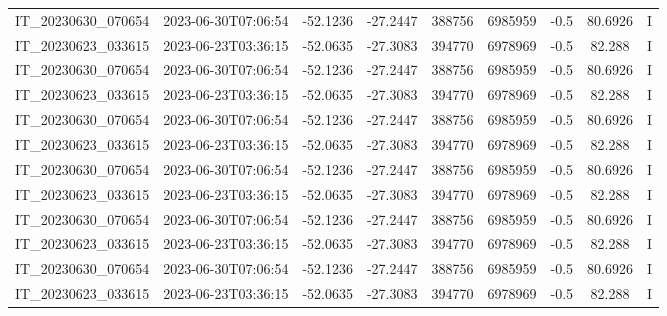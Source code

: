 \begin{small}
\begin{longtable}{ccccccccc}
\hline
\endlastfoot
IT\_20230630\_070654 & 2023-06-30T07:06:54 & -52.1236 & -27.2447 & 388756 & 6985959 & -0.5 & \num[round-precision=3,round-mode=figures,scientific-notation=true]{80.6926} & I \\
IT\_20230623\_033615 & 2023-06-23T03:36:15 & -52.0635 & -27.3083 & 394770 & 6978969 & -0.5 & \num[round-precision=3,round-mode=figures,scientific-notation=true]{82.288} & I \\
IT\_20230630\_070654 & 2023-06-30T07:06:54 & -52.1236 & -27.2447 & 388756 & 6985959 & -0.5 & \num[round-precision=3,round-mode=figures,scientific-notation=true]{80.6926} & I \\
IT\_20230623\_033615 & 2023-06-23T03:36:15 & -52.0635 & -27.3083 & 394770 & 6978969 & -0.5 & \num[round-precision=3,round-mode=figures,scientific-notation=true]{82.288} & I \\
IT\_20230630\_070654 & 2023-06-30T07:06:54 & -52.1236 & -27.2447 & 388756 & 6985959 & -0.5 & \num[round-precision=3,round-mode=figures,scientific-notation=true]{80.6926} & I \\
IT\_20230623\_033615 & 2023-06-23T03:36:15 & -52.0635 & -27.3083 & 394770 & 6978969 & -0.5 & \num[round-precision=3,round-mode=figures,scientific-notation=true]{82.288} & I \\
IT\_20230630\_070654 & 2023-06-30T07:06:54 & -52.1236 & -27.2447 & 388756 & 6985959 & -0.5 & \num[round-precision=3,round-mode=figures,scientific-notation=true]{80.6926} & I \\
IT\_20230623\_033615 & 2023-06-23T03:36:15 & -52.0635 & -27.3083 & 394770 & 6978969 & -0.5 & \num[round-precision=3,round-mode=figures,scientific-notation=true]{82.288} & I \\
IT\_20230630\_070654 & 2023-06-30T07:06:54 & -52.1236 & -27.2447 & 388756 & 6985959 & -0.5 & \num[round-precision=3,round-mode=figures,scientific-notation=true]{80.6926} & I \\
IT\_20230623\_033615 & 2023-06-23T03:36:15 & -52.0635 & -27.3083 & 394770 & 6978969 & -0.5 & \num[round-precision=3,round-mode=figures,scientific-notation=true]{82.288} & I \\
IT\_20230630\_070654 & 2023-06-30T07:06:54 & -52.1236 & -27.2447 & 388756 & 6985959 & -0.5 & \num[round-precision=3,round-mode=figures,scientific-notation=true]{80.6926} & I \\
IT\_20230623\_033615 & 2023-06-23T03:36:15 & -52.0635 & -27.3083 & 394770 & 6978969 & -0.5 & \num[round-precision=3,round-mode=figures,scientific-notation=true]{82.288} & I \\

\end{longtable}
\end{small}
